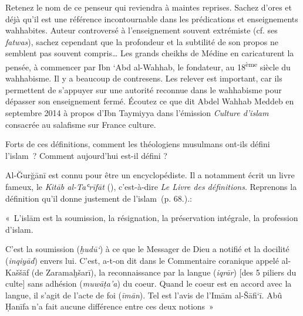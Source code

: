 Retenez le nom de ce penseur qui reviendra à maintes reprises. Sachez
d'ores et déjà qu'il est une référence incontournable dans les
prédications et enseignements wahhabites. Auteur controversé à
l'enseignement souvent extrémiste (cf. ses \emph{fatwas}), sachez
cependant que la profondeur et la subtilité de son propos ne semblent
pas souvent compris\ldots{} Les grands cheikhs de Médine en caricaturent
la pensée, à commencer par Ibn `Abd al-Wahhab, le fondateur, au
18\textsuperscript{ème} siècle du wahhabisme. Il y a beaucoup de
contresens. Les relever est important, car ils permettent de s'appuyer
sur une autorité reconnue dans le wahhabisme pour dépasser son
enseignement fermé.
 Écoutez ce que dit Abdel Wahhab Meddeb en septembre
  2014 à propos d'Ibn Taymiyya dans l'émission \emph{Culture d'islam}
  consacrée au salafisme sur France culture.
\label{sec:wahhabisme}

Forts de ces définitions, comment les théologiens musulmans ont-ils
défini l'islam~? Comment aujourd'hui est-il défini ?



Al-Ğurğānī est connu pour être un encyclopédiste. Il a notamment écrit
un livre fameux, le \emph{Kitāb al-Taʿrīfāt} (),
c'est-à-dire \emph{Le Livre des définitions}. Reprenons la définition
qu'il donne justement de l'islam~(p. 68.).:


\begin{Def}
«~L'islām est la soumission, la résignation, la préservation intégrale,
la profession d'islam.

C'est la soumission (\emph{ḫudū`}) à ce que le Messager de Dieu a
notifié et la docilité (\emph{inqiyād}) envers lui. C'est, a-t-on dit
dans le Commentaire coranique appelé al-Kaššāf (de Zaramaḫšarī), la
reconnaissance par la langue (\emph{iqrār}) {[}des 5 piliers du culte{]}
sans adhésion (\emph{muwāṭa'a}) du coeur. Quand le coeur est en accord
avec la langue, il s'agit de l'acte de foi (\emph{īmān}). Tel est l'avis
de l'Imām al-Šāfi`ī. Abû Ḥanīfa n'a fait aucune différence entre ces
deux notions~»
\end{Def}


